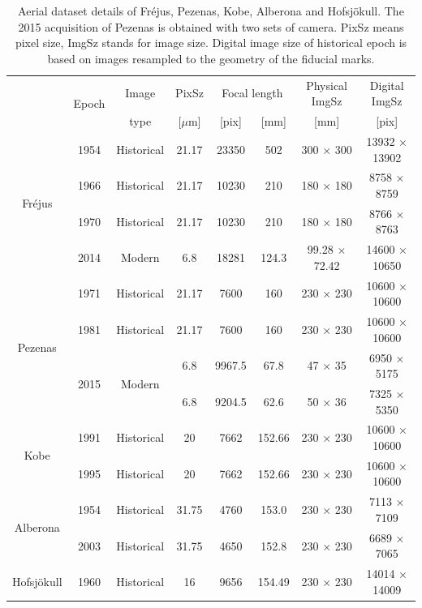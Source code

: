 \begin{table}[htbp]
	\centering
	\begin{tabular}{||c|c||c|c|c|c|c|c||}\hline
		& \multirow{2}{*}{Epoch} & Image & PixSz & \multicolumn{2}{c|}{Focal length} & Physical ImgSz & Digital ImgSz\\
		& & type & [$\mu$m] & [pix] & [mm] & [mm] & [pix]\\\hline\hline
		
		\multirow{4}{*}{Fr{\'e}jus} & 1954 & Historical & 21.17 & 23350 & 502 & 300 $\times$ 300 & 13932 $\times$ 13902 \\
		& 1966 & Historical & 21.17 & 10230 & 210 & 180 $\times$ 180 & 8758 $\times$ 8759\\
		& 1970 & Historical & 21.17 & 10230 & 210 & 180 $\times$ 180 & 8766 $\times$ 8763\\
		& 2014 & Modern & 6.8 & 18281 & 124.3 & 99.28 $\times$ 72.42 & 14600 $\times$ 10650 \\\hline\hline
		
		\multirow{4}{*}{Pezenas} & 1971 & Historical & 21.17 & 7600 & 160 & 230 $\times$ 230 & 10600 $\times$ 10600 \\
		& 1981 & Historical & 21.17 & 7600 & 160 & 230 $\times$ 230 & 10600 $\times$ 10600\\
		& \multirow{2}{*}{2015} & \multirow{2}{*}{Modern} & 6.8 & 9967.5 & 67.8 & 47 $\times$ 35 & 6950 $\times$ 5175\\
		& & & 6.8 & 9204.5 & 62.6 & 50 $\times$ 36 & 7325 $\times$ 5350 \\\hline\hline
		
		\multirow{2}{*}{Kobe}& 1991 & Historical & 20 & 7662 & 152.66 & 230 $\times$ 230 & 10600 $\times$ 10600\\
		& 1995 & Historical & 20 & 7662 & 152.66 & 230 $\times$ 230 & 10600 $\times$ 10600\\\hline\hline
		
		\multirow{2}{*}{Alberona}& 1954 & Historical & 31.75 & 4760 & 153.0 & 230 $\times$ 230 & 7113 $\times$ 7109 \\
		& 2003 & Historical & 31.75 & 4650 & 152.8 & 230 $\times$ 230 & 6689 $\times$ 7065 \\\hline\hline
		
		Hofsjökull & 1960 & Historical & 16 & 9656 & 154.49 & 230 $\times$ 230 & 14014 $\times$ 14009 \\\hline
	\end{tabular}
	\caption{Aerial dataset details of Fr{\'e}jus, Pezenas, Kobe, Alberona and Hofsjökull. The 2015 acquisition of Pezenas is obtained with two sets of camera. PixSz means pixel size, ImgSz stands for image size. Digital image size of historical epoch is based on images resampled to the geometry of the fiducial marks.}
	\label{AerialData}
\end{table}

